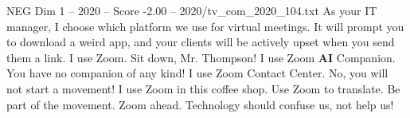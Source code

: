 \begin{textsample}{NEG Dim 1 – 2020 – Score -2.00 – 2020/tv\_com\_2020\_104.txt}  \label{ex:f1_neg_003}
As your IT manager, I choose which platform we use for virtual meetings.
It will prompt you to download a weird app, and your clients will be actively upset when you send them a link.
I use Zoom.
Sit down, Mr.
Thompson!
I use Zoom \textbf{AI} Companion.
You have no companion of any kind!
I use Zoom Contact Center.
No, you will not start a movement!
I use Zoom in this coffee shop.
Use Zoom to translate.
Be part of the movement.
Zoom ahead.
Technology should confuse us, not help us!

\end{textsample}

